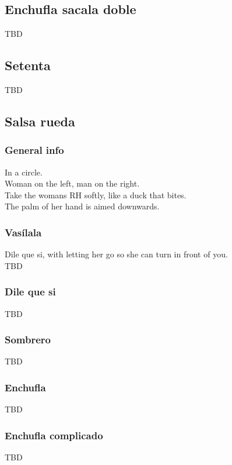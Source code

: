 \subsection{Enchufla sacala doble}
TBD

\subsection{Setenta}
TBD

\subsection{Salsa rueda}
\subsubsection{General info}
In a circle.\\
Woman on the left, man on the right.\\
Take the womans RH softly, like a duck that bites.\\
The palm of her hand is aimed downwards.

\subsubsection{Vas\'{i}lala}
Dile que si, with letting her go so she can turn in front of you.\\
TBD

\subsubsection{Dile que si}
TBD

\subsubsection{Sombrero}
TBD

\subsubsection{Enchufla}
TBD

\subsubsection{Enchufla complicado}
TBD
